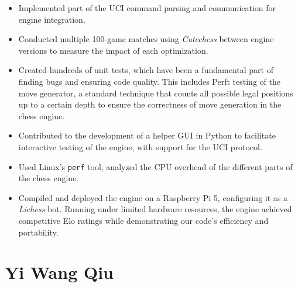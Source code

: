 \begin{itemize}[itemsep=1pt]
    \item Implemented part of the UCI command parsing and communication for engine integration.

    \item Conducted multiple 100-game matches using \textit{Cutechess} between engine versions to measure the impact of each optimization.

    \item Created hundreds of unit tests, which have been a fundamental part of finding bugs and ensuring code quality. This includes Perft testing of the move generator, a standard technique that counts all possible legal positions up to a certain depth to ensure the correctness of move generation in the chess engine.

    \item Contributed to the development of a helper GUI in Python to facilitate interactive testing of the engine, with support for the UCI protocol.    

    \item Used Linux's \texttt{perf} tool, analyzed the CPU overhead of the different parts of the chess engine.

    \item Compiled and deployed the engine on a Raspberry Pi 5, configuring it as a \textit{Lichess} bot. Running under limited hardware resources, the engine achieved competitive Elo ratings while demonstrating our code's efficiency and portability.

\end{itemize}

\section*{Yi Wang Qiu}

